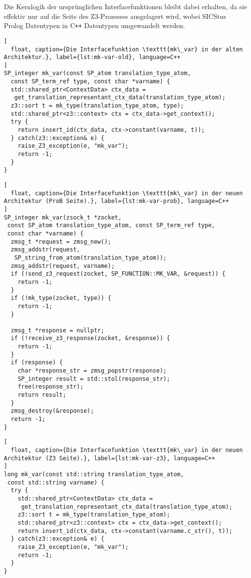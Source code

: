 Die Kernlogik der ursprünglichen Interfacefunktionen bleibt dabei erhalten, da sie effektiv nur auf die Seite des Z3-Prozesses ausgelagert wird,
wobei SICStus Prolog Datentypen in C\texttt{++} Datentypen umgewandelt werden.

\begin{lstlisting}[
  float, caption={Die Interfacefunktion \texttt{mk\_var} in der alten Architektur.}, label={lst:mk-var-old}, language=C++
]
SP_integer mk_var(const SP_atom translation_type_atom,
  const SP_term_ref type, const char *varname) {
  std::shared_ptr<ContextData> ctx_data =
   get_translation_representant_ctx_data(translation_type_atom);
  z3::sort t = mk_type(translation_type_atom, type);
  std::shared_ptr<z3::context> ctx = ctx_data->get_context();
  try {
    return insert_id(ctx_data, ctx->constant(varname, t));
  } catch(z3::exception& e) {
    raise_Z3_exception(e, "mk_var");
    return -1;
  }
}
\end{lstlisting}

\begin{lstlisting}[
  float, caption={Die Interfacefunktion \texttt{mk\_var} in der neuen Architektur (ProB Seite).}, label={lst:mk-var-prob}, language=C++
]
SP_integer mk_var(zsock_t *zocket,
 const SP_atom translation_type_atom, const SP_term_ref type,
 const char *varname) {
  zmsg_t *request = zmsg_new();
  zmsg_addstr(request,
   SP_string_from_atom(translation_type_atom));
  zmsg_addstr(request, varname);
  if (!send_z3_request(zocket, SP_FUNCTION::MK_VAR, &request)) {
    return -1;
  }
  if (!mk_type(zocket, type)) {
    return -1;
  }

  zmsg_t *response = nullptr;
  if (!receive_z3_response(zocket, &response)) {
    return -1;
  }
  if (response) {
    char *response_str = zmsg_popstr(response);
    SP_integer result = std::stol(response_str);
    free(response_str);
    return result;
  }
  zmsg_destroy(&response);
  return -1;
}
\end{lstlisting}

\begin{lstlisting}[
  float, caption={Die Interfacefunktion \texttt{mk\_var} in der neuen Architektur (Z3 Seite).}, label={lst:mk-var-z3}, language=C++
]
long mk_var(const std::string translation_type_atom,
 const std::string varname) {
  try {
    std::shared_ptr<ContextData> ctx_data =
     get_translation_representant_ctx_data(translation_type_atom);
    z3::sort t = mk_type(translation_type_atom);
    std::shared_ptr<z3::context> ctx = ctx_data->get_context();
    return insert_id(ctx_data, ctx->constant(varname.c_str(), t));
  } catch(z3::exception& e) {
    raise_Z3_exception(e, "mk_var");
    return -1;
  }
}
\end{lstlisting}

